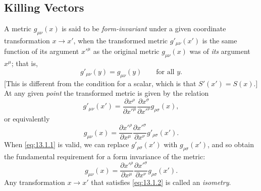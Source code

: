 
\subsection{Killing Vectors}\label{sec:13.1}

A metric \(g_{\mu\nu}(x)\) is said to be \emph{form-invariant} under a given
coordinate transformation \(x\longrightarrow x'\), when the transformed
metric \(g'_{\mu\nu}(x')\) is the same function of its argument \(x'^\mu\) as
the original metric \(g_{\mu\nu}(x)\) was of \emph{its} argument \(x^\mu\);
that is,
\begin{equation}
  g'_{\mu\nu}(y)=g_{\mu\nu}(y)
  \qquad\text{for all \(y\)}.
  \tag{13.1.1}\label{eq:13.1.1}
\end{equation}
[This is different from the condition for a scalar, which is that
\(S'(x')=S(x)\).] At any given \emph{point} the transformed metric is given
by the relation
\[
  g'_{\mu\nu}(x')
  =
  \frac{\partial x^\rho}{\partial x'^\mu}
  \frac{\partial x^\sigma}{\partial x'^\nu}
  g_{\rho\sigma}(x),
\]
or equivalently
\[
  g_{\mu\nu}(x)
  =
  \frac{\partial x'^\rho}{\partial x^\mu}
  \frac{\partial x'^\sigma}{\partial x^\nu}
  g'_{\rho\sigma}(x').
\]
When \eqref{eq:13.1.1} is valid, we can replace
\(g'_{\rho\sigma}(x')\) with \(g_{\rho\sigma}(x')\), and so obtain the
fundamental requirement for a form invariance of the metric:
\begin{equation}
  g_{\mu\nu}(x)
  =
  \frac{\partial x'^\rho}{\partial x^\mu}
  \frac{\partial x'^\sigma}{\partial x^\nu}
  g_{\rho\sigma}(x').
  \tag{13.1.2}\label{eq:13.1.2}
\end{equation}
Any transformation \(x\longrightarrow x'\) that satisfies
\eqref{eq:13.1.2} is called an \emph{isometry}.

